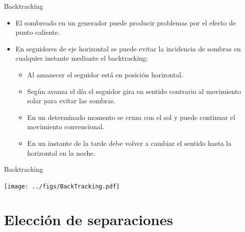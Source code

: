 \documentclass[aspectratio=169, usenames,svgnames,dvipsnames]{beamer}
\begin{document}
\begin{frame}[label={sec:org47417ab}]{Backtracking}
\begin{itemize}
\item El \alert{sombreado} en un generador puede producir problemas por el efecto
de \alert{punto caliente}.

\item En seguidores de eje horizontal se puede \alert{evitar la incidencia de
sombras} en cualquier instante mediante el \guillemotleft{}\alert{backtracking}\guillemotright{}:

\begin{itemize}
\item Al \alert{amanecer} el seguidor está en posición \alert{horizontal}.

\item Según avanza el día el seguidor gira en \alert{sentido contrario al
movimiento solar para evitar las sombras}.

\item En un determinado momento se cruza con el sol y puede continuar el
movimiento \guillemotleft{}convencional\guillemotright{}.

\item En un instante de la tarde debe volver a cambiar el sentido hasta
la \alert{horizontal en la noche}.
\end{itemize}
\end{itemize}
\end{frame}

\begin{frame}[label={sec:org21123df}]{Backtracking}
\begin{center}
\texttt{[image: ../figs/BackTracking.pdf]}
\end{center}
\end{frame}


\section{Elección de separaciones}
\label{sec:orgaf12289}
\end{document}
